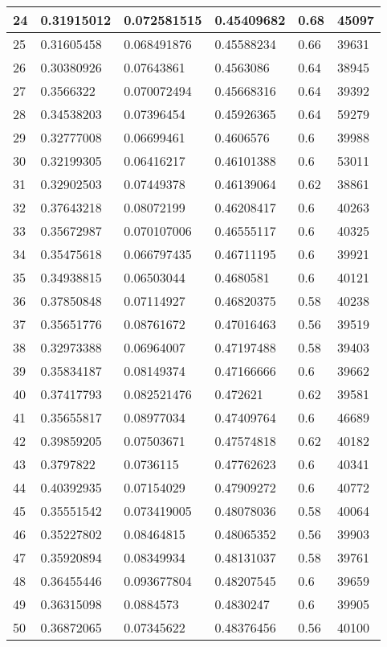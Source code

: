 \begin{longtable}{|l|l|l|l|l|l|}
24 & 0.31915012 & 0.072581515 & 0.45409682 & 0.68 & 45097 \\ \hline 
25 & 0.31605458 & 0.068491876 & 0.45588234 & 0.66 & 39631 \\ \hline 
26 & 0.30380926 & 0.07643861 & 0.4563086 & 0.64 & 38945 \\ \hline 
27 & 0.3566322 & 0.070072494 & 0.45668316 & 0.64 & 39392 \\ \hline 
28 & 0.34538203 & 0.07396454 & 0.45926365 & 0.64 & 59279 \\ \hline 
29 & 0.32777008 & 0.06699461 & 0.4606576 & 0.6 & 39988 \\ \hline 
30 & 0.32199305 & 0.06416217 & 0.46101388 & 0.6 & 53011 \\ \hline 
31 & 0.32902503 & 0.07449378 & 0.46139064 & 0.62 & 38861 \\ \hline 
32 & 0.37643218 & 0.08072199 & 0.46208417 & 0.6 & 40263 \\ \hline 
33 & 0.35672987 & 0.070107006 & 0.46555117 & 0.6 & 40325 \\ \hline 
34 & 0.35475618 & 0.066797435 & 0.46711195 & 0.6 & 39921 \\ \hline 
35 & 0.34938815 & 0.06503044 & 0.4680581 & 0.6 & 40121 \\ \hline 
36 & 0.37850848 & 0.07114927 & 0.46820375 & 0.58 & 40238 \\ \hline 
37 & 0.35651776 & 0.08761672 & 0.47016463 & 0.56 & 39519 \\ \hline 
38 & 0.32973388 & 0.06964007 & 0.47197488 & 0.58 & 39403 \\ \hline 
39 & 0.35834187 & 0.08149374 & 0.47166666 & 0.6 & 39662 \\ \hline 
40 & 0.37417793 & 0.082521476 & 0.472621 & 0.62 & 39581 \\ \hline 
41 & 0.35655817 & 0.08977034 & 0.47409764 & 0.6 & 46689 \\ \hline 
42 & 0.39859205 & 0.07503671 & 0.47574818 & 0.62 & 40182 \\ \hline 
43 & 0.3797822 & 0.0736115 & 0.47762623 & 0.6 & 40341 \\ \hline 
44 & 0.40392935 & 0.07154029 & 0.47909272 & 0.6 & 40772 \\ \hline 
45 & 0.35551542 & 0.073419005 & 0.48078036 & 0.58 & 40064 \\ \hline 
46 & 0.35227802 & 0.08464815 & 0.48065352 & 0.56 & 39903 \\ \hline 
47 & 0.35920894 & 0.08349934 & 0.48131037 & 0.58 & 39761 \\ \hline 
48 & 0.36455446 & 0.093677804 & 0.48207545 & 0.6 & 39659 \\ \hline 
49 & 0.36315098 & 0.0884573 & 0.4830247 & 0.6 & 39905 \\ \hline 
50 & 0.36872065 & 0.07345622 & 0.48376456 & 0.56 & 40100 \\ \hline 
\end{longtable}
